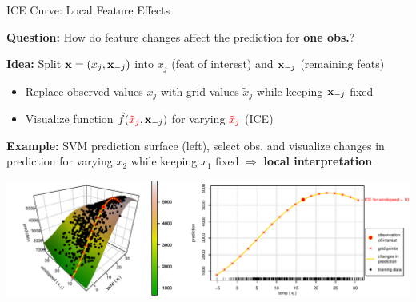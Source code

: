 \documentclass[10pt,compress,t,notes=noshow, xcolor=table]{beamer}
\begin{document}
\begin{frame}{ICE Curve: Local Feature Effects}

\textbf{Question:} How do feature changes affect the prediction for \textbf{one obs.}?



\textbf{Idea:} Split $\mathbf{x} = (x_j, \mathbf{x}_{-j})$ into $x_j$ (feat of interest) and $\mathbf{x}_{-j}$ (remaining feats) 
\begin{itemize}
    \item Replace observed values $x_j$ with {\color{red} grid values $\tilde x_j$} while keeping $\mathbf{x}_{-j}$ fixed
    \item Visualize function $\hat{f}({\color{red}\tilde x_j}, \mathbf{x}_{-j})$ for varying ${\color{red}\tilde x_j}$ (ICE)%
\end{itemize}

\pause

\textbf{Example:} SVM prediction surface (left), select obs. and visualize changes in prediction for varying $x_2$ while keeping $x_1$ fixed $\Rightarrow$ \textbf{local interpretation}

\vfill
\centering
\includegraphics[width=\textwidth, page = 1]{figure/ice_motivation_bike}

\end{frame}
\end{document}
